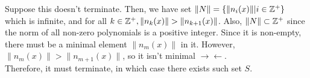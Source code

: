 Suppose this doesn't terminate. Then, we have set $\|N\|=\{\|n_i(x)\||i\in\mathbb{Z}^+\}$ which is infinite, and for all  $k\in\bZ^+, \|n_k(x)\|>\|n_{k+1}(x)\|$. Also, $\|N\|\subset\mathbb{Z}^+$ since the norm of all non-zero polynomials is a positive integer. Since it is non-empty, there must be a minimal element $\|n_m(x)\|$ in it. However, $\|n_m(x)\|>\|n_{m+1}(x)\|$, so it isn't minimal $\xrightarrow{}\xleftarrow{}$.\\
 
Therefore, it must terminate, in which case there exists such set $S$.\\
 
